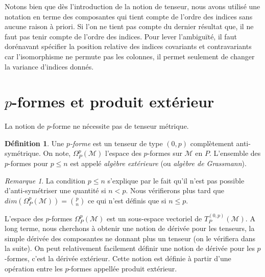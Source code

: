 \documentclass[a4paper,11pt]{report}
\theoremstyle{definition}
\theoremstyle{plain}
\theoremstyle{definition}
\newtheorem{defn}{Définition}[chapter]
\theoremstyle{remark}
\newtheorem{rmk}{Remarque}[chapter]
\newcommand{\M}{\mathscr{M}}
\begin{document}
                Notons bien que dès l'introduction de la notion de tenseur, nous avons utilisé une notation en terme des composantes qui tient compte de l'ordre des indices sans aucune raison à priori. Si l'on ne tient pas compte du dernier résultat que, il ne faut pas tenir compte de l'ordre des indices. Pour lever l'ambiguïté, il faut dorénavant spécifier la position relative des indices covariants et contravariants car l'isomorphisme ne permute pas les colonnes, il permet seulement de changer la variance d'indices donnés.
        
        \section{$p$-formes et produit extérieur}
        
            La notion de $p$-forme ne nécessite pas de tenseur métrique.
            
            \begin{defn}
                Une $p$\textit{-forme} est un tenseur de type $(0,p)$ complètement anti-symétrique. On note, $\Omega_P^p(\M)$ l'espace des $p$-formes sur $\M$ en $P$. L'ensemble des $p$-formes pour $p\leq n$ est appelé \textit{algèbre extérieure} (ou \textit{algèbre de Grassmann}).
            \end{defn}
            
            \begin{rmk}
                La condition $p\leq n$ s'explique par le fait qu'il n'est pas possible d'anti-symétriser une quantité si $n<p$. Nous vérifierons plus tard que $dim(\Omega_P^p(\M)) = {p \choose n}$ ce qui n'est définis que si $n\leq p$.
            \end{rmk}
            
             L'espace des $p$-formes $\Omega_P^p(\M)$ est un sous-espace vectoriel de $T_P^{(0,p)}(\M)$. A long terme, nous cherchons à obtenir une notion de dérivée pour les tenseurs, la simple dérivée des composantes ne donnant plus un tenseur (on le vérifiera dans la suite). On peut relativement facilement définir une notion de dérivée pour les $p$-formes, c'est la dérivée extérieur. Cette notion est définie à partir d'une opération entre les $p$-formes appellée produit extérieur.\\
            
\end{document}

